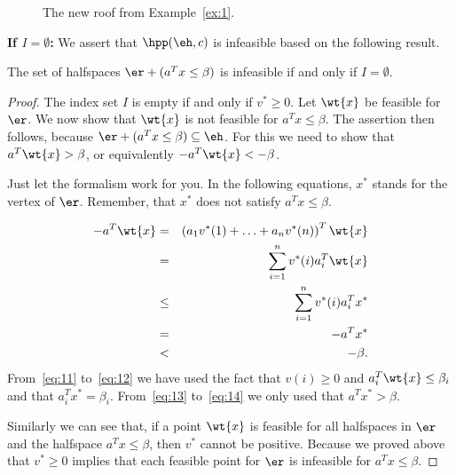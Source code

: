   \begin{figure}[htbp]
    \begin{center}
      
      \caption{The new roof from  Example~\ref{ex:1}.} 
      \label{fig:ex:1.2}
    \end{center}
  \end{figure}


\noindent 
{\bf If $I = \emptyset$: } We assert that $\hpp(\eh,c)$ is infeasible based on
the following result. 

\begin{proposition}
  \label{thr:3}
  The set of halfspaces   $\er + (a^Tx \leq\beta)$ is infeasible if and only
  if $I = \emptyset$.
\end{proposition}

\begin{proof}
  The index set  $I$ is empty if and only if $v^*\geq0$. Let $\wt{x}$ be
  feasible for $\er$. We now 
  show that $\wt{x}$ is not feasible for $a^Tx\leq\beta$. The assertion then
  follows, because  $\er + (a^Tx\leq\beta) \subseteq \eh$. 
  For this we need to show that $a^T\wt{x}>\beta$, or equivalently 
  $-a^T\wt{x} < -\beta$.  
  
  Just let the formalism work for you. In the following equations,
  $x^*$ stands for the vertex of $\er$. Remember, that $x^*$ does not
  satisfy $a^Tx\leq\beta$. 

  \begin{eqnarray}
    -a^T \wt{x} & = & \left( a_1 v^*(1) + \ldots + a_n v^*(n)\right)^T  \wt{x} \label{eq:10}\\
               & = & \sum_{i=1}^n v^*(i) a_i^T\wt{x} \label{eq:11}\\
               & \leq &  \sum_{i=1}^n v^*(i) a_i^T x^*  \label{eq:12}\\ 
               & = &  -a^T x^*   \label{eq:13}\\
               & < & - \beta. \label{eq:14}
  \end{eqnarray}
From~\eqref{eq:11} to~\eqref{eq:12} we have used the fact that
$v(i)\geq0$ and  $a_i^T\wt{x} \leq\beta_i$ and that $a_i^Tx^* = \beta_i$.
From~\eqref{eq:13} to~\eqref{eq:14} we only used that $a^Tx^* >
\beta$. 


Similarly we can see that, if a point $\wt{x}$ is feasible for all 
halfspaces in $\er$ and the halfspace $a^Tx\leq\beta$, then $v^*$ cannot be
positive. Because we proved above that $v^*\geq0$ implies that each
feasible point for $\er$ is infeasible for $a^Tx\leq\beta$. 
\end{proof}


